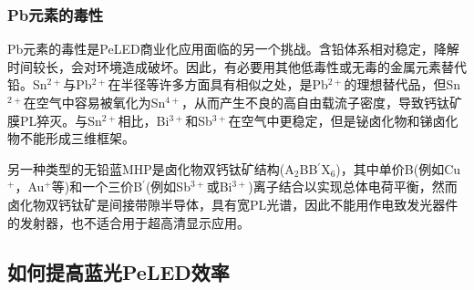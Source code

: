 \documentclass{phyasgn}\usepackage{nag}
\begin{document}
\subsubsection{Pb元素的毒性}
\par Pb元素的毒性是PeLED商业化应用面临的另一个挑战。含铅体系相对稳定，降解时间较长，会对环境造成破坏。因此，有必要用其他低毒性或无毒的金属元素替代铅。Sn$^{2+}$与Pb$^{2+}$在半径等许多方面具有相似之处，是Pb$^{2+}$的理想替代品，但Sn$^{2+}$在空气中容易被氧化为Sn$^{4+}$，从而产生不良的高自由载流子密度，导致钙钛矿膜PL猝灭。与Sn$^{2+}$相比，Bi$^{3+}$和Sb$^{3+}$在空气中更稳定，但是铋卤化物和锑卤化物不能形成三维框架。
\par 另一种类型的无铅蓝MHP是卤化物双钙钛矿结构(A$_2$BB$^{\prime}$X$_{6}$)，其中单价B(例如Cu$^{+}$，Au$^{+}$等)和一个三价B$^{\prime}$(例如Sb$^{3+}$或Bi$^{3+}$)离子结合以实现总体电荷平衡，然而卤化物双钙钛矿是间接带隙半导体，具有宽PL光谱，因此不能用作电致发光器件的发射器，也不适合用于超高清显示应用。
\subsection{如何提高蓝光PeLED效率}
\end{document}
